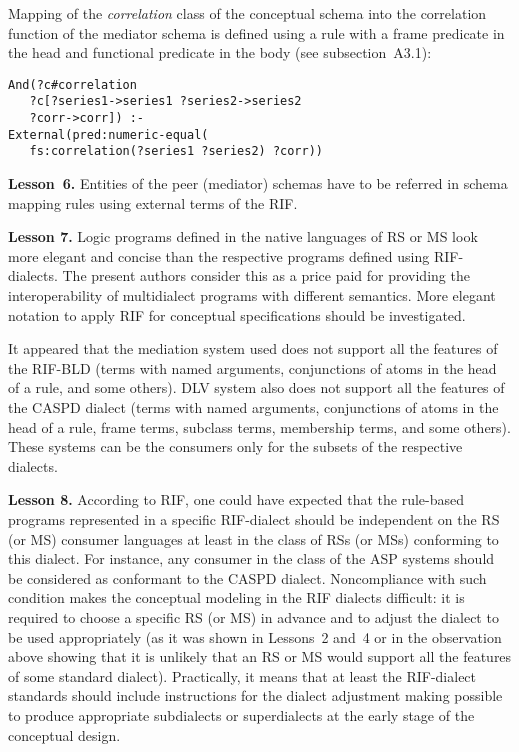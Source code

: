 \begin{multicols}{2}
  Mapping of the \textit{correlation} class of the conceptual schema into the
correlation function of the mediator schema is defined using a rule with a frame
predicate in the head and functional predicate in the body (see subsection~A3.1):
  \begin{verbatim}
And(?c#correlation
   ?c[?series1->series1 ?series2->series2
   ?corr->corr]) :-
External(pred:numeric-equal(
   fs:correlation(?series1 ?series2) ?corr))
\end{verbatim}

\vspace*{-2pt}

\noindent
  \textbf{Lesson~6.} Entities of the peer (mediator) schemas have to be referred in
schema mapping rules using external terms of the RIF.

  \smallskip

  \noindent
  \textbf{Lesson 7.} Logic programs defined in the native languages of RS or MS
look more elegant and concise than the respective programs defined using
  RIF-dialects. The present authors consider this as a price paid for providing the interoperability of
multidialect programs with different semantics. More elegant notation to apply RIF
for conceptual specifications should be investigated.

   It appeared that the mediation system used does not support all the features of the
RIF-BLD (terms with named arguments, conjunctions of atoms in the head of a rule,
and some others). DLV system also does not support all the features of the CASPD
dialect (terms with named arguments, conjunctions of atoms in the head of a rule,
frame terms, subclass terms, membership terms, and some others). These systems can
be the consumers only for the subsets of the respective dialects.

  \smallskip

  \noindent
  \textbf{Lesson 8.} According to RIF, one could have expected that 
  the rule-based programs represented in a specific RIF-dialect should be 
  independent on the RS (or MS) consumer languages at least in the class of RSs (or MSs) 
  conforming to this dialect. For instance, any consumer in the class of the ASP 
  systems should be considered as conformant to the CASPD dialect. Noncompliance with 
  such condition makes the conceptual modeling in the RIF dialects difficult: 
  it is required to choose a specific RS (or MS) in advance and to adjust the dialect 
  to be used appropriately (as it was shown in Lessons~2 and~4 or in the observation 
  above showing that it is unlikely that an RS or MS would support all the features 
  of some standard dialect). Practically, it means that at least the RIF-dialect 
  standards should include instructions for the dialect adjustment making possible 
  to produce appropriate subdialects or superdialects at the early stage of the 
  conceptual design.


\end{multicols}
